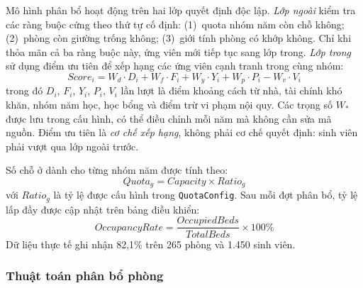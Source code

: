 \documentclass[../DoAn.tex]{subfiles}
\begin{document}
Mô hình phân bổ hoạt động trên hai lớp quyết định độc lập. \textit{Lớp ngoài}
kiểm tra các ràng buộc cứng theo thứ tự cố định: (1)~quota nhóm năm còn chỗ
không; (2)~phòng còn giường trống không; (3)~giới tính phòng có khớp không.
Chỉ khi thỏa mãn cả ba ràng buộc này, ứng viên mới tiếp tục sang lớp trong.
\textit{Lớp trong} sử dụng điểm ưu tiên để xếp hạng các ứng viên cạnh tranh
trong cùng nhóm:
\begin{equation}
Score_i = W_d \cdot D_i + W_f \cdot F_i + W_y \cdot Y_i + W_p \cdot P_i - W_v \cdot V_i
\label{eq:priority_score}
\end{equation}
trong đó $D_i$, $F_i$, $Y_i$, $P_i$, $V_i$ lần lượt là điểm khoảng cách từ
nhà, tài chính khó khăn, nhóm năm học, học bổng và điểm trừ vi phạm nội quy.
Các trọng số $W_\ast$ được lưu trong cấu hình, có thể điều chỉnh mỗi năm mà
không cần sửa mã nguồn. Điểm ưu tiên là \textit{cơ chế xếp hạng}, không phải
cơ chế quyết định: sinh viên phải vượt qua lớp ngoài trước.

Số chỗ ở dành cho từng nhóm năm được tính theo:
\begin{equation}
Quota_g = Capacity \times Ratio_g
\label{eq:quota}
\end{equation}
với $Ratio_g$ là tỷ lệ được cấu hình trong \texttt{QuotaConfig}. Sau mỗi đợt
phân bổ, tỷ lệ lấp đầy được cập nhật trên bảng điều khiển:
\begin{equation}
OccupancyRate = \frac{OccupiedBeds}{TotalBeds} \times 100\%
\label{eq:occupancy}
\end{equation}
Dữ liệu thực tế ghi nhận 82,1\% trên 265 phòng và 1.450 sinh viên.

\subsubsection{Thuật toán phân bổ phòng}
\end{document}
